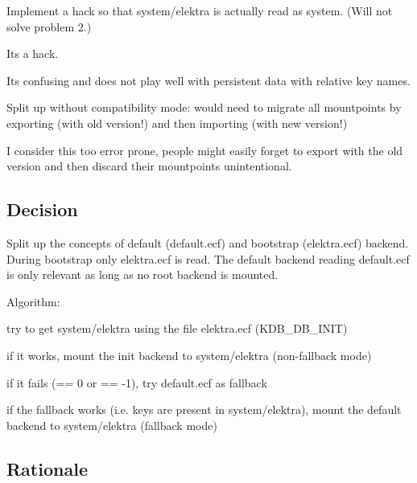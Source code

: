 \begin{DoxyItemize}
\item Implement a hack so that {\ttfamily system/elektra} is actually read as {\ttfamily system}. (Will not solve problem 2.)
\begin{DoxyItemize}
\item Its a hack.
\item Its confusing and does not play well with persistent data with relative key names.
\end{DoxyItemize}
\item Split up without compatibility mode\+: would need to migrate all mountpoints by exporting (with old version!) and then importing (with new version!)
\begin{DoxyItemize}
\item I consider this too error prone, people might easily forget to export with the old version and then discard their mountpoints unintentional.
\end{DoxyItemize}
\end{DoxyItemize}

\subsection*{Decision}

Split up the concepts of default ({\ttfamily default.\+ecf}) and bootstrap ({\ttfamily elektra.\+ecf}) backend. During bootstrap only {\ttfamily elektra.\+ecf} is read. The default backend reading {\ttfamily default.\+ecf} is only relevant as long as no root backend is mounted.

Algorithm\+:


\begin{DoxyEnumerate}
\item try to get system/elektra using the file elektra.\+ecf (K\+D\+B\+\_\+\+D\+B\+\_\+\+I\+N\+IT)
\item if it works, mount the init backend to system/elektra (non-\/fallback mode)
\item if it fails (== 0 or == -\/1), try default.\+ecf as fallback
\item if the fallback works (i.\+e. keys are present in system/elektra), mount the default backend to system/elektra (fallback mode)
\end{DoxyEnumerate}

\subsection*{Rationale}


